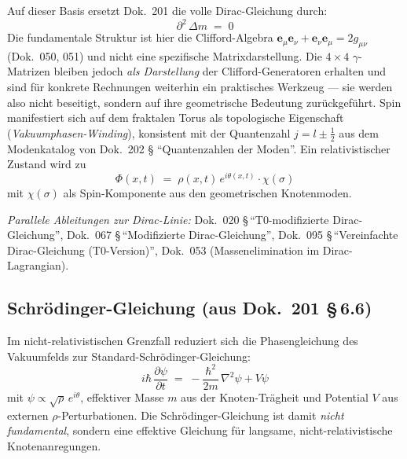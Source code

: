 Auf dieser Basis ersetzt Dok.~201 die volle Dirac-Gleichung durch:
\begin{equation}
  \partial^{2}\,\Delta m \;=\; 0
  \tag{202.\,QM-2}
\end{equation}
Die fundamentale Struktur ist hier die Clifford-Algebra
$\mathbf{e}_\mu\mathbf{e}_\nu + \mathbf{e}_\nu\mathbf{e}_\mu = 2g_{\mu\nu}$
(Dok.~050, 051) und nicht eine spezifische Matrixdarstellung. Die
$4\times 4$ $\gamma$-Matrizen bleiben jedoch \emph{als Darstellung} der
Clifford-Generatoren erhalten und sind für konkrete Rechnungen weiterhin
ein praktisches Werkzeug --- sie werden also nicht beseitigt, sondern
auf ihre geometrische Bedeutung zurückgeführt. Spin manifestiert sich
auf dem fraktalen Torus als topologische Eigenschaft
(\emph{Vakuumphasen-Winding}), konsistent mit der Quantenzahl
$j = l \pm \tfrac12$ aus dem Modenkatalog von Dok.~202 \S
\enquote{Quantenzahlen der Moden}. Ein relativistischer Zustand wird zu
\begin{equation}
  \Phi(x,t) \;=\; \rho(x,t)\,e^{i\theta(x,t)}\cdot \chi(\sigma)
  \tag{202.\,QM-3}
\end{equation}
mit $\chi(\sigma)$ als Spin-Komponente aus den geometrischen Knotenmoden.

\textit{Parallele Ableitungen zur Dirac-Linie:}
Dok.~020 \S\,\enquote{T0-modifizierte Dirac-Gleichung},
Dok.~067 \S\,\enquote{Modifizierte Dirac-Gleichung},
Dok.~095 \S\,\enquote{Vereinfachte Dirac-Gleichung (T0-Version)},
Dok.~053 (Massenelimination im Dirac-Lagrangian).

\subsection*{Schrödinger-Gleichung (aus Dok.~201 \S\,6.6)}

Im nicht-relativistischen Grenzfall reduziert sich die Phasengleichung
des Vakuumfelds zur Standard-Schrödinger-Gleichung:
\begin{equation}
  i\hbar\,\frac{\partial\psi}{\partial t}
  \;=\; -\frac{\hbar^{2}}{2m}\,\nabla^{2}\psi + V\psi
  \tag{202.\,QM-4}
\end{equation}
mit $\psi \propto \sqrt{\rho}\,e^{i\theta}$, effektiver Masse $m$ aus
der Knoten-Trägheit und Potential $V$ aus externen
$\rho$-Perturbationen. Die Schrödinger-Gleichung ist damit
\emph{nicht fundamental}, sondern eine effektive Gleichung für langsame,
nicht-relativistische Knotenanregungen.

